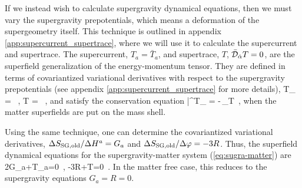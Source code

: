 \vskip0.2cm
If we instead wish to calculate supergravity dynamical equations, then we must vary the supergravity prepotentials, which means a deformation of the supergeometry itself. This technique is outlined in appendix \ref{app:supercurrent_supertrace}, where we will use it to calculate the supercurrent and supertrace. The supercurrent, $T_a = {\bar T}_a$, and supertrace, $T$, ${\bar {{\cal D}}}_{\dot{\alpha}} T=0$, are the superfield generalization of the energy-momentum tensor. They are defined in terms of covariantized variational derivatives with respect to the supergravity prepotentials (see appendix \ref{app:supercurrent_supertrace} for more details),
\be
\label{eq:supercurrent-supertrace}
T_{\a \ad} =  ~,
\qquad \quad
T =  ~,
\ee
and satisfy the conservation equation
\be
\label{eq:conservation}
{\bar \cD}^{\ad}T_{\a \ad} = -\,\cD_\a T~,
\ee
when the matter superfields are put on the mass shell.

Using the same technique, one can determine the covariantized variational derivatives, $\Delta S_{\rm SG,old}/\Delta H^a=G_a$ and \-$\Delta S_{\rm SG,old}/\Delta \varphi=-3R$. Thus, the superfield dynamical equations for the supergravity-matter system (\ref{eq:sugra-matter}) are
\be
2G_a+T_a=0~,\quad\qquad
-3R+T=0~.
\ee
In the matter free case, this reduces to the supergravity equations $G_a=R=0$.


\vskip0.5cm
